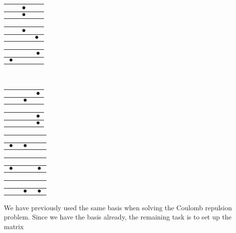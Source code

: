 \begin{center}
\begin{tabular}{|c|c|c|}
\hline
$\phantom{\bullet}$ & $\bullet$ & $\phantom{\bullet}$ \\ \hline
 & $\bullet$ &  \\
\hline
\end{tabular}
\begin{tabular}{|c|c|c|}
\hline
$\phantom{\bullet}$ & $\bullet$ & $\phantom{\bullet}$ \\ \hline
 &  & $\bullet$ \\
\hline
\end{tabular}
\begin{tabular}{|c|c|c|}
\hline
$\phantom{\bullet}$ & $\phantom{\bullet}$ & $\bullet$ \\ \hline
$\bullet$ &  &  \\
\hline
\end{tabular} \\
\vspace{0.5em}
\begin{tabular}{|c|c|c|}
\hline
$\phantom{\bullet}$ & $\phantom{\bullet}$ & $\bullet$ \\ \hline
 & $\bullet$ &  \\
\hline
\end{tabular}
\begin{tabular}{|c|c|c|}
\hline
$\phantom{\bullet}$ & $\phantom{\bullet}$ & $\bullet$ \\ \hline
 &  & $\bullet$ \\
\hline
\end{tabular}
\begin{tabular}{|c|c|c|}
\hline
$\phantom{\bullet}$ & $\phantom{\bullet}$ & $\phantom{\bullet}$ \\ \hline
$\bullet$ & $\bullet$ &  \\
\hline
\end{tabular}
\begin{tabular}{|c|c|c|}
\hline
$\phantom{\bullet}$ & $\phantom{\bullet}$ & $\phantom{\bullet}$ \\ \hline
$\bullet$ &  & $\bullet$ \\
\hline
\end{tabular}
\begin{tabular}{|c|c|c|}
\hline
$\phantom{\bullet}$ & $\phantom{\bullet}$ & $\phantom{\bullet}$ \\ \hline
 & $\bullet$ & $\bullet$ \\
\hline
\end{tabular}
\end{center}
%
We have previously used the same basis when solving the Coulomb repulsion problem.
Since we have the basis already, the remaining task is to set up the matrix
